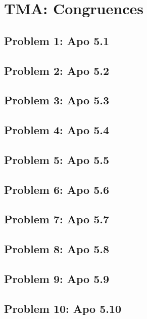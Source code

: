 \section{TMA: Congruences}

\subsection[Problem 1]{Problem 1: Apo 5.1}

\subsection[Problem 2]{Problem 2: Apo 5.2}

\subsection[Problem 3]{Problem 3: Apo 5.3}

\subsection[Problem 4]{Problem 4: Apo 5.4}

\subsection[Problem 5]{Problem 5: Apo 5.5}

\subsection[Problem 6]{Problem 6: Apo 5.6}

\subsection[Problem 7]{Problem 7: Apo 5.7}

\subsection[Problem 8]{Problem 8: Apo 5.8}

\subsection[Problem 9]{Problem 9: Apo 5.9}

\subsection[Problem 10]{Problem 10: Apo 5.10}